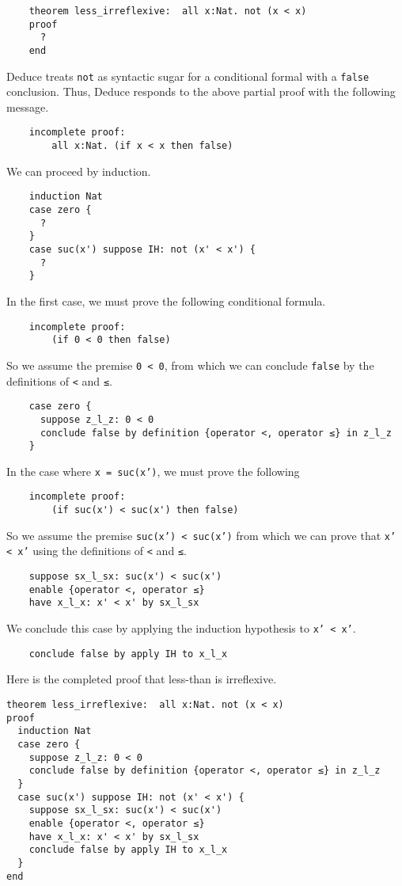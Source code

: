 \documentclass[12pt]{article}
\begin{document}
\begin{verbatim}
    theorem less_irreflexive:  all x:Nat. not (x < x)
    proof
      ?
    end
\end{verbatim}
Deduce treats \texttt{not} as syntactic sugar for a conditional formal with a
\texttt{false} conclusion. Thus, Deduce responds to the above partial proof
with the following message.
\begin{verbatim}
    incomplete proof:
        all x:Nat. (if x < x then false)
\end{verbatim}
We can proceed by induction.
\begin{verbatim}
    induction Nat
    case zero {
      ?
    }
    case suc(x') suppose IH: not (x' < x') {
      ?
    }
\end{verbatim}
In the first case, we must prove the following conditional formula.
\begin{verbatim}
    incomplete proof:
        (if 0 < 0 then false)
\end{verbatim}
So we assume the premise \texttt{0 < 0}, from which we can conclude
\texttt{false} by the definitions of \texttt{<} and \texttt{≤}.
\begin{verbatim}
    case zero {
      suppose z_l_z: 0 < 0
      conclude false by definition {operator <, operator ≤} in z_l_z
    }
\end{verbatim}
In the case where \texttt{x = suc(x')}, we must prove the following
\begin{verbatim}
    incomplete proof:
        (if suc(x') < suc(x') then false)
\end{verbatim}
So we assume the premise \texttt{suc(x') < suc(x')} from which we can
prove that \texttt{x' < x'} using the definitions of \texttt{<} and
\texttt{≤}.
\begin{verbatim}
    suppose sx_l_sx: suc(x') < suc(x')
    enable {operator <, operator ≤}
    have x_l_x: x' < x' by sx_l_sx
\end{verbatim}
We conclude this case by applying the induction hypothesis to \texttt{x' < x'}.
\begin{verbatim}
    conclude false by apply IH to x_l_x
\end{verbatim}
Here is the completed proof that less-than is irreflexive.

\begin{verbatim}
theorem less_irreflexive:  all x:Nat. not (x < x)
proof
  induction Nat
  case zero {
    suppose z_l_z: 0 < 0
    conclude false by definition {operator <, operator ≤} in z_l_z
  }
  case suc(x') suppose IH: not (x' < x') {
    suppose sx_l_sx: suc(x') < suc(x')
    enable {operator <, operator ≤}
    have x_l_x: x' < x' by sx_l_sx
    conclude false by apply IH to x_l_x
  }
end
\end{verbatim}
\end{document}
